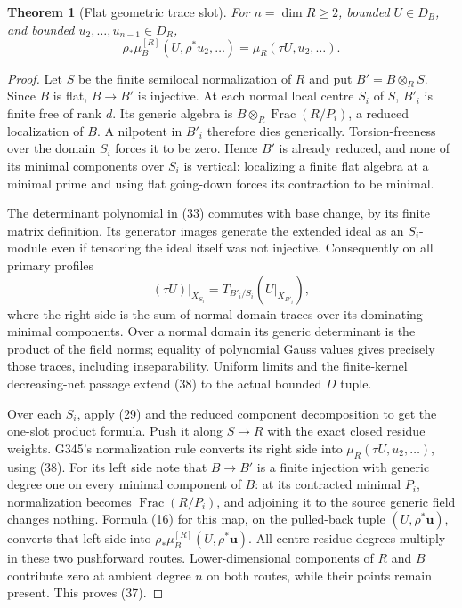\documentclass[11pt]{article}
\newtheorem{theorem}{Theorem}
\begin{document}
\begin{theorem}[Flat geometric trace slot]
For \(n=\dim R\geq2\), bounded \(U\in D_B\), and bounded
\(u_2,\ldots,u_{n-1}\in D_R\),
\[
 \rho_*\mu_B^{[R]}(U,\rho^*u_2,\ldots)
                =\mu_R(\tau U,u_2,\ldots).                   \tag{37}
\]
\end{theorem}
\begin{proof}
Let \(S\) be the finite semilocal normalization of \(R\) and
put \(B'=B\otimes_R S\). Since \(B\) is flat, \(B\to B'\)
is injective. At each normal local centre \(S_i\) of \(S\),
\(B'_i\) is finite free of rank \(d\).
Its generic algebra is
\(B\otimes_R\operatorname{Frac}(R/P_i)\), a reduced
localization of \(B\). A nilpotent in \(B'_i\) therefore
dies generically. Torsion-freeness over the domain \(S_i\)
forces it to be zero. Hence \(B'\) is already reduced,
and none of its minimal components over \(S_i\) is vertical:
localizing a finite flat algebra at a minimal prime and
using flat going-down forces its contraction to be minimal.

The determinant polynomial in (33) commutes with base change,
by its finite matrix definition. Its generator images generate
the extended ideal as an \(S_i\)-module even if tensoring the
ideal itself was not injective. Consequently on all primary
profiles
\[
 (\tau U)|_{X_{S_i}}
       =T_{B'_i/S_i}(U|_{X_{B'_i}}),                          \tag{38}
\]
where the right side is the sum of normal-domain traces
over its dominating minimal components.
Over a normal domain its generic determinant is the product
of the field norms; equality of polynomial Gauss values
gives precisely those traces, including inseparability.
Uniform limits and the finite-kernel decreasing-net passage
extend (38) to the actual bounded \(D\) tuple.

Over each \(S_i\), apply (29) and the reduced component
decomposition to get the one-slot product formula.
Push it along \(S\to R\) with the exact closed residue
weights. G345's normalization rule converts its right
side into \(\mu_R(\tau U,u_2,\ldots)\), using (38).
For its left side note that \(B\to B'\) is a finite
injection with generic degree one on every minimal
component of \(B\): at its contracted minimal \(P_i\),
normalization becomes \(\operatorname{Frac}(R/P_i)\),
and adjoining it to the source generic field changes
nothing. Formula (16) for this map, on the pulled-back
tuple \((U,\rho^*\boldsymbol u)\), converts that left
side into \(\rho_*\mu_B^{[R]}(U,\rho^*\boldsymbol u)\).
All centre residue degrees multiply in these two
pushforward routes. Lower-dimensional components of
\(R\) and \(B\) contribute zero at ambient degree \(n\)
on both routes, while their points remain present.
This proves (37).
\end{proof}
\end{document}
